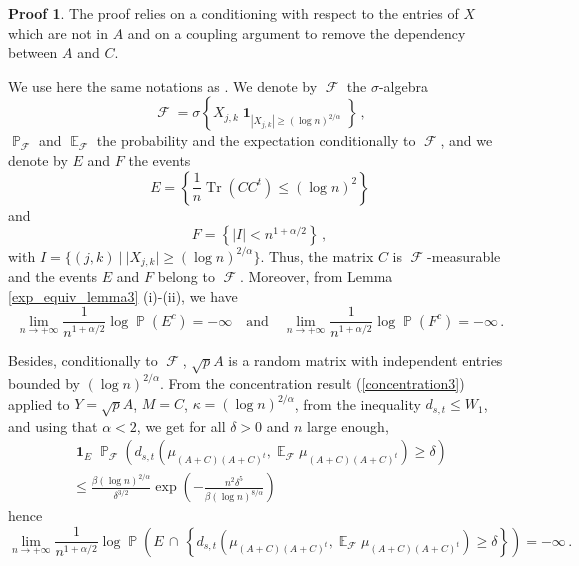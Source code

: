 \documentclass[11pt,a4paper]{article}
\DeclareMathOperator{\E}{\mathbb{E}}
\DeclareMathOperator{\PR}{\mathbb{P}}
\DeclareMathOperator{\FF}{\mathcal{F}}
\DeclareMathOperator{\1}{\mathbf{1}}
\DeclareMathOperator{\Tr}{\mathrm{Tr}}
\theoremstyle{definition}
\newtheorem*{Proof}{Proof}
\begin{document}
\begin{Proof}
The proof relies on a conditioning with respect to the entries of $X$ which are not in $A$ and on a coupling argument to remove the dependency between $A$ and $C$.

We use here the same notations as \cite{BC}. We denote by $\FF$ the $\sigma$-algebra
\begin{displaymath}
\FF = \sigma \left\{ X_{j,k} \1_{|X_{j,k}| \ge (\log n)^{2/\alpha}} \right\} \, ,
\end{displaymath}
$\PR_{\FF}$ and $\E_{\FF}$ the probability and the expectation conditionally to $\FF$, and we denote by $E$ and $F$ the events
\begin{displaymath}
E = \left\{ \frac1n \Tr(CC^t) \le (\log n)^2 \right\}
\end{displaymath}
and
\begin{displaymath}
F = \left\{ |I| < n^{1+\alpha/2} \right\} \, ,
\end{displaymath}
with $I=\{ (j,k) \ | \ |X_{j,k}| \ge (\log n)^{2/\alpha} \}$. Thus, the matrix $C$ is $\FF$-measurable and the events $E$ and $F$ belong to $\FF$. Moreover, from Lemma \ref{exp_equiv_lemma3} (i)-(ii), we have
\begin{equation} \label{exp_equiv_eq4}
\lim_{n \to +\infty} \frac{1}{n^{1+\alpha/2}} \log \PR(E^c) = -\infty \quad \mathrm{and} \quad \lim_{n \to +\infty} \frac{1}{n^{1+\alpha/2}} \log \PR(F^c) = -\infty \, .
\end{equation}

Besides, conditionally to $\FF$, $\sqrt{p}A$ is a random matrix with independent entries bounded by $(\log n)^{2/\alpha}$. From the concentration result (\ref{concentration3}) applied to $Y=\sqrt{p}A$, $M=C$, $\kappa=(\log n)^{2/\alpha}$, from the inequality $d_{s,t} \le W_1$, and using that $\alpha<2$, we get for all $\delta>0$ and $n$ large enough,
\begin{multline*}
\1_E \PR_{\FF} \left( d_{s,t} \left( \mu_{(A+C)(A+C)^t} , \E_{\FF} \mu_{(A+C)(A+C)^t} \right) \ge \delta \right) \\
\le \frac{\beta (\log n)^{2/\alpha}}{\delta^{3/2}} \exp \left( -\frac{n^2\delta^5}{\beta (\log n)^{8/\alpha}} \right)
\end{multline*}
hence
\begin{equation} \label{exp_equiv_eq5}
\lim_{n \to +\infty} \frac{1}{n^{1+\alpha/2}} \log \PR \left( E \, \cap \, \left\{ d_{s,t} \left( \mu_{(A+C)(A+C)^t} , \E_{\FF} \mu_{(A+C)(A+C)^t} \right) \ge \delta \right\} \right) = -\infty \, .
\end{equation}


\end{Proof}
\end{document}
